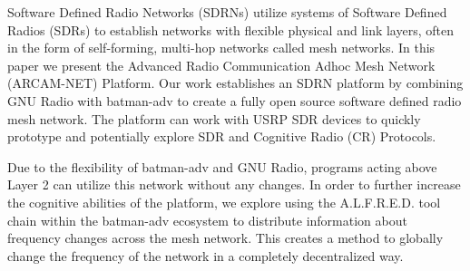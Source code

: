 
Software Defined Radio Networks (SDRNs) utilize systems of Software Defined Radios (SDRs) to establish networks with flexible physical and link layers, often in the form of self-forming, multi-hop networks called mesh networks. In this paper we present the Advanced Radio Communication Adhoc Mesh Network (ARCAM-NET) Platform. Our work establishes an SDRN platform by combining GNU Radio with batman-adv to create a fully open source software defined radio mesh network. The platform can work with USRP SDR devices to quickly prototype and potentially explore SDR and Cognitive Radio (CR) Protocols. 

Due to the flexibility of batman-adv and GNU Radio, programs acting above Layer 2 can utilize this network without any changes. In order to further increase the cognitive abilities of the platform, we explore using the A.L.F.R.E.D. tool chain within the batman-adv ecosystem to distribute information about frequency changes across the mesh network. This creates a method to globally change the frequency of the network in a completely decentralized way. 

